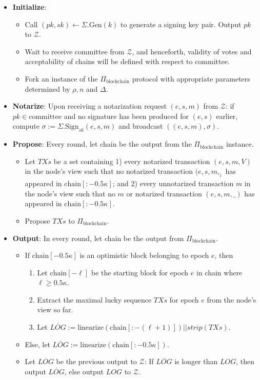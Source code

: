 \begin{itemize}
    \item \textbf{Initialize}:
    \begin{itemize}
        \item Call $(pk,sk) \xleftarrow{} \Sigma.\text{Gen}(k)$ to generate a signing key pair. Output $pk$ to $\mathcal{Z}$.
        \item Wait to receive committee from $\mathcal{Z}$, and henceforth, validity of votes and acceptability of chains will be defined with respect to committee.
        \item Fork an instance of the $\Pi_\text{blockchain}$ protocol with appropriate parameters determined by $\rho, n$ and $\Delta$.
    \end{itemize}
    
    \item \textbf{Notarize}: Upon receiving a notarization request $(e,s,m)$ from $\mathcal{Z}$: if $pk \in \text{committee}$ and no signature has been produced for $(e,s)$ earlier, compute $\sigma := \Sigma.\text{Sign}_{sk}(e,s,m)$ and broadcast $((e,s,m),\sigma)$.
    
    \item \textbf{Propose}: Every round, let chain be the output from the $\Pi_\text{blockchain}$ instance.
    \begin{itemize}
        \item Let $TXs$ be a set containing 1) every notarized transaction $(e,s,m,V)$ in the node's view such that no notarized transaction $(e,s,m,_)$ has appeared in $\text{chain}[:-0.5\kappa]$; and 2) every unnotarized transaction $m$ in the node's view such that no $m$ or notarized transaction $(e,s,m,\_)$ has appeared in $\text{chain}[:-0.5\kappa]$.
        \item Propose $TXs$ to $\Pi_\text{blockchain}$.
    \end{itemize}
    
    \item \textbf{Output}: In every round, let chain be the output from $\Pi_\text{blockchain}$.
    \begin{itemize}
        \item If $\text{chain}[-0.5\kappa]$ is an optimistic block belonging to epoch $e$, then
        \begin{enumerate}
            \item Let $\text{chain}[-\ell]$ be the starting block for epoch $e$ in chain where $\ell \geq 0.5\kappa$.
            \item Extract the maximal lucky sequence $TXs$ for epoch $e$ from the node's view so far.
            \item Let $\overline{LOG} := \text{linearize}(\text{chain}[:-(\ell+1)])||strip(TXs)$.
        \end{enumerate}
        \item Else, let $\overline{LOG} := \text{linearize}(\text{chain}[:-0.5\kappa])$.
        \item Let $LOG$ be the previous output to $\mathcal{Z}$: If $\overline{LOG}$ is longer than $LOG$, then output $\overline{LOG}$, else output $LOG$ to $\mathcal{Z}$.
    \end{itemize}
    

\end{itemize}
